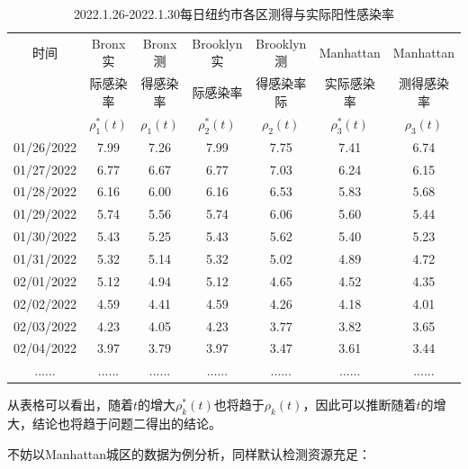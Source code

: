 \documentclass[withoutpreface,bwprint]{cumcmthesis} %
\begin{document}
\begin{table}[H]
\centering
\begin{tabular}{ccccccc}
\toprule
时间 & Bronx实 & Bronx测 & Brooklyn实 & Brooklyn测 & Manhattan & Manhattan \\
     & 际感染率& 得感染率& 际感染率& 得感染率际  &实际感染率   &测得感染率\\
     & $\rho^*_1(t)$ & $\rho_1(t)$& $\rho^*_2(t)$& $\rho_2(t)$  &$\rho^*_3(t)$   &$\rho_3(t)$\\
\midrule
01/26/2022 & 7.99       & 7.26       & 7.99          & 7.75          & 7.41           & 6.74           \\
01/27/2022 & 6.77       & 6.67       & 6.77          & 7.03          & 6.24           & 6.15           \\
01/28/2022 & 6.16       & 6.00       & 6.16          & 6.53          & 5.83           & 5.68           \\
01/29/2022 & 5.74       & 5.56       & 5.74          & 6.06          & 5.60           & 5.44           \\
01/30/2022 & 5.43       & 5.25       & 5.43          & 5.62          & 5.40           & 5.23           \\
01/31/2022 & 5.32       & 5.14       & 5.32          & 5.02          & 4.89           & 4.72           \\
02/01/2022 & 5.12       & 4.94       & 5.12          & 4.65          & 4.52           & 4.35           \\
02/02/2022 & 4.59       & 4.41       & 4.59          & 4.26          & 4.18           & 4.01           \\
02/03/2022 & 4.23       & 4.05       & 4.23          & 3.77          & 3.82           & 3.65           \\
02/04/2022 & 3.97       & 3.79       & 3.97          & 3.47          & 3.61           & 3.44           \\
......     & ......     & ......     & ......        & ......        & ......         & ......        \\
\bottomrule
\end{tabular}
\caption{2022.1.26-2022.1.30每日纽约市各区测得与实际阳性感染率}
\end{table}

从表格可以看出，随着$t$的增大$\rho^*_k(t)$也将趋于$\rho_k(t)$，因此可以推断随着$t$的增大，结论也将趋于问题二得出的结论。

不妨以Manhattan城区的数据为例分析，同样默认检测资源充足：
\end{document}
